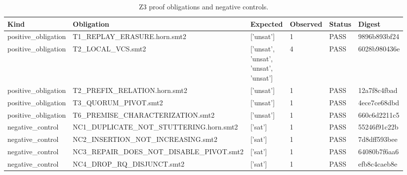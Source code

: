 \begin{table}[t]
\centering
\small
\begin{tabular}{p{0.157\linewidth}p{0.157\linewidth}p{0.157\linewidth}p{0.157\linewidth}p{0.157\linewidth}p{0.157\linewidth}}
\toprule
Kind & Obligation & Expected & Observed & Status & Digest \\
\midrule
positive\_obligation & T1\_REPLAY\_ERASURE.horn.smt2 & ['unsat'] & 1 & PASS & 9896b893bf24 \\
positive\_obligation & T2\_LOCAL\_VCS.smt2 & ['unsat', 'unsat', 'unsat', 'unsat'] & 4 & PASS & 6028b980436e \\
positive\_obligation & T2\_PREFIX\_RELATION.horn.smt2 & ['unsat'] & 1 & PASS & 12a7f8c4fbad \\
positive\_obligation & T3\_QUORUM\_PIVOT.smt2 & ['unsat'] & 1 & PASS & 4ece7ce68dbd \\
positive\_obligation & T6\_PREMISE\_CHARACTERIZATION.smt2 & ['unsat'] & 1 & PASS & 660c6d2211c5 \\
negative\_control & NC1\_DUPLICATE\_NOT\_STUTTERING.horn.smt2 & ['sat'] & 1 & PASS & 55246f91c22b \\
negative\_control & NC2\_INSERTION\_NOT\_INCREASING.smt2 & ['sat'] & 1 & PASS & 7d8dff593bee \\
negative\_control & NC3\_REPAIR\_DOES\_NOT\_DISABLE\_PIVOT.smt2 & ['sat'] & 1 & PASS & 64080b7f6aa6 \\
negative\_control & NC4\_DROP\_RQ\_DISJUNCT.smt2 & ['sat'] & 1 & PASS & efb8c4caeb8e \\
\bottomrule
\end{tabular}
\caption{Z3 proof obligations and negative controls.}
\label{tab:table4_smt_migration}
\end{table}
